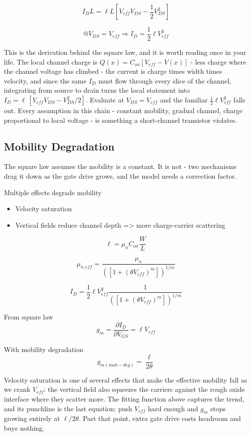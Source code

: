\[ I_{D} L = \ell L \left[V_{eff}V_{DS} - \frac{1}{2} V_{DS}^2\right] \]

\[ @ V_{DS} = V_{eff} \Rightarrow I_{D} = \frac{1}{2} \ell V_{eff}^2 \]

This is the derivation behind the square law, and it is worth reading
once in your life. The local channel charge is
\(Q(x) = C_{ox}[V_{eff} - V(x)]\) - less charge where the channel
voltage has climbed - the current is charge times width times velocity,
and since the same \(I_D\) must flow through every slice of the channel,
integrating from source to drain turns the local statement into
\(I_D = \ell\,[V_{eff}V_{DS} - V_{DS}^2/2]\). Evaluate at
\(V_{DS} = V_{eff}\) and the familiar \(\frac{1}{2}\ell V_{eff}^2\)
falls out. Every assumption in this chain - constant mobility, gradual
channel, charge proportional to local voltage - is something a
short-channel transistor violates.

\subsection{Mobility Degradation}\label{mobility-degradation}

The square law assumes the mobility is a constant. It is not - two
mechanisms drag it down as the gate drive grows, and the model needs a
correction factor.

Multiple effects degrade mobility

\begin{itemize}
\tightlist
\item
  Velocity saturation
\item
  Vertical fields reduce channel depth =\textgreater{} more
  charge-carrier scattering
\end{itemize}

\[ \ell = \mu_n C_{ox} \frac{W}{L} \]

\[ \mu_{n\_eff} = \frac{\mu_n}{([1 + (\theta V_{eff})^m])^{1/m}} \]

\[ I_{D} = \frac{1}{2} \ell V_{eff}^2 \frac{1}{([1 + (\theta V_{eff})^m])^{1/m}} \]

From square law
\[ g_{m} = \frac{\partial I_{D}}{\partial V_{GS}} =   \ell V_{eff} \]

With mobility degradation \[ g_{m(mob-deg)} = \frac{\ell}{2 \theta} \]

Velocity saturation is one of several effects that make the effective
mobility fall as we crank \(V_{eff}\): the vertical field also squeezes
the carriers against the rough oxide interface where they scatter more.
The fitting function above captures the trend, and its punchline is the
last equation: push \(V_{eff}\) hard enough and \(g_m\) stops growing
entirely at \(\ell/2\theta\). Past that point, extra gate drive costs
headroom and buys nothing.

